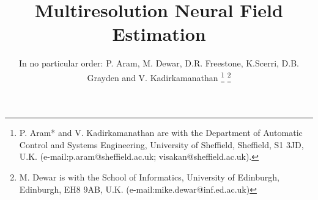 \documentclass[journal,a4paper]{IEEEtran}
\begin{document}
%
\title{Multiresolution Neural Field Estimation }
%
%
%

\author{In no particular order: P. Aram, M. Dewar, D.R. Freestone, K.Scerri, D.B. Grayden and V. Kadirkamanathan %
\thanks{P. Aram* and V. Kadirkamanathan are with the Department of Automatic Control and Systems Engineering, University of Sheffield, Sheffield, S1 3JD, U.K. (e-mail:p.aram@sheffield.ac.uk; visakan@sheffield.ac.uk).}%
\thanks{M. Dewar is with the School of Informatics, University of Edinburgh, Edinburgh, EH8 9AB, U.K. (e-mail:mike.dewar@inf.ed.ac.uk)}}%

% 
%



% 
 \ifCLASSOPTIONpeerreview
\else
\fi
\end{document}
